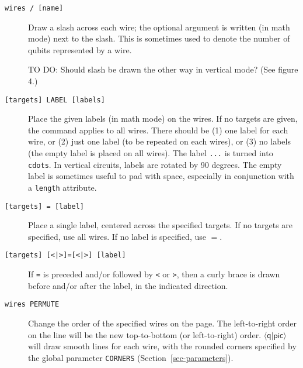 \documentclass[twoside,12pt]{article}
\newcommand{\qpic}{$\langle\mathsf{q}|\mathsf{pic}\rangle$\xspace}
\begin{document}
\begin{description}
\item[{\tt wires / [name]}] Draw a slash across each wire; the optional argument is written (in math mode) next to the
slash.  This is sometimes used to denote the number of qubits represented by a wire.

\begin{minipage}[b]{2in}

\end{minipage} \hfill 

TO DO: Should slash be drawn the other way in vertical mode?  (See figure 4.)

\item[{\tt [targets] LABEL [labels]}] Place the given labels (in math mode) on the wires.
  If no targets are given, the command applies to all wires.
  There should be (1) one label for each wire,
  or (2) just one label (to be repeated on each wires),
  or (3) no labels (the empty label is placed on all wires).  The label {\tt ...}
  is turned into {\tt {} cdots}.
  In vertical circuits, labels are rotated by 90 degrees.
  The empty label is sometimes useful to pad with space, especially in conjunction
  with a {\tt length} attribute.
  
\begin{minipage}[b]{2in}

\end{minipage} \hfill 

\item[{\tt [targets] = [label]}] Place a single label, centered across the specified targets.  If no targets are specified, use all wires.  If no label is specified, use $=$.

\begin{minipage}[b]{2in}

\end{minipage} \hfill 

\item[{\tt [targets] [<|>]=[<|>] [label]}] If {\tt =} is preceded and/or followed by
  {\tt <} or {\tt >}, then a curly brace is drawn before and/or after the label, in the
  indicated direction.

\begin{minipage}[b]{2in}

\end{minipage} \hfill 

\item[{\tt wires PERMUTE}] Change the order of the specified wires on the page.  The
  left-to-right order on the line will be the new top-to-bottom (or left-to-right) order.
  \qpic will draw smooth lines for each wire, with the rounded corners specified by
  the global parameter {\tt CORNERS} (Section~\ref{sec-parameters}).

\begin{minipage}[b]{2in}

\end{minipage} \hfill 

  
\end{description}
\end{document}
